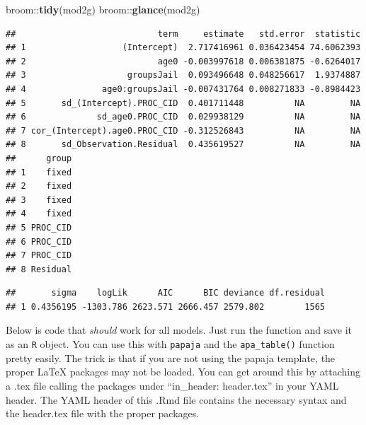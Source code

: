 \documentclass[]{article}
\newenvironment{Shaded}{\begin{snugshade}}{\end{snugshade}}
\newcommand{\KeywordTok}[1]{\textcolor[rgb]{0.13,0.29,0.53}{\textbf{{#1}}}}
\newcommand{\NormalTok}[1]{{#1}}
\begin{document}
\begin{Shaded}
\begin{Highlighting}[]
\NormalTok{broom::}\KeywordTok{tidy}\NormalTok{(mod2g)}
\NormalTok{broom::}\KeywordTok{glance}\NormalTok{(mod2g)}
\end{Highlighting}
\end{Shaded}

\small

\begin{verbatim}
##                            term     estimate   std.error  statistic
## 1                   (Intercept)  2.717416961 0.036423454 74.6062393
## 2                          age0 -0.003997618 0.006381875 -0.6264017
## 3                    groupsJail  0.093496648 0.048256617  1.9374887
## 4               age0:groupsJail -0.007431764 0.008271833 -0.8984423
## 5       sd_(Intercept).PROC_CID  0.401711448          NA         NA
## 6              sd_age0.PROC_CID  0.029938129          NA         NA
## 7 cor_(Intercept).age0.PROC_CID -0.312526843          NA         NA
## 8       sd_Observation.Residual  0.435619527          NA         NA
##      group
## 1    fixed
## 2    fixed
## 3    fixed
## 4    fixed
## 5 PROC_CID
## 6 PROC_CID
## 7 PROC_CID
## 8 Residual
\end{verbatim}

\begin{verbatim}
##       sigma    logLik      AIC      BIC deviance df.residual
## 1 0.4356195 -1303.786 2623.571 2666.457 2579.802        1565
\end{verbatim}

Below is code that \emph{should} work for all models. Just run the
function and save it as an \texttt{R} object. You can use this with
\texttt{papaja} and the \texttt{apa\_table()} function pretty easily.
The trick is that if you are not using the papaja template, the proper
LaTeX packages may not be loaded. You can get around this by attaching a
.tex file calling the packages under ``in\_header: header.tex'' in your
YAML header. The YAML header of this .Rmd file contains the necessary
syntax and the header.tex file with the proper packages.
\end{document}

